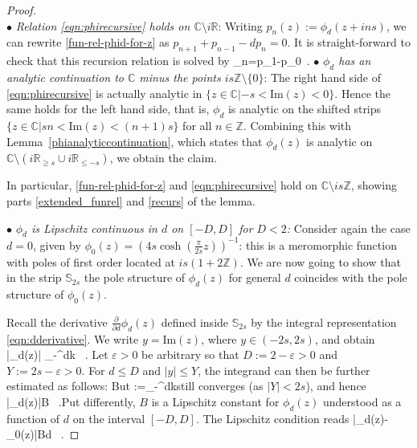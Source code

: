 \documentclass[12pt]{article}
\theoremstyle{plain}
\theoremstyle{definition}
\numberwithin{equation}{section}
\numberwithin{theorem}{section}
\def\be#1\ee{\begin{equation}#1\end{equation}}
\begin{document}
\begin{proof}~\\
$\bullet$ {\em Relation \eqref{eqn:phirecursive} holds on
$\mathbb{C}\setminus i\mathbb{R}$}: Writing $p_n(z):=\phi_d(z+ins)$, we can rewrite \eqref{fun-rel-phid-for-z} as $p_{n+1}+p_{n-1}-dp_n=0$. 
 It is straight-forward to check that this recursion relation is solved by \be
 p_n=p_1-p_0\ .
 \ee
$\bullet$ {\em $\phi_d$ has an analytic continuation to $\mathbb{C}$ minus the points $is\mathbb{Z}\setminus\lbrace 0\rbrace$}: 
The right hand side of \eqref{eqn:phirecursive} is actually analytic in $\{ z \in \mathbb{C} | -s < \mathrm{Im}(z) < 0 \}$. Hence the same holds for the left hand side, that is, $\phi_d$ is analytic on the shifted strips $\{ z \in \mathbb{C} | sn < \mathrm{Im}(z) < (n+1)s \}$ for all $n \in \mathbb{Z}$. Combining this with Lemma~\ref{phianalyticcontinuation}, which states that $\phi_d(z)$ is analytic on $\mathbb{C}\setminus (i\mathbb{R}_{\geq s}\cup i\mathbb{R}_{\leq -s})$, we obtain the claim.

In particular, \eqref{fun-rel-phid-for-z} and \eqref{eqn:phirecursive} hold on $\mathbb{C} \setminus is\mathbb{Z}$, showing parts \ref{extended_funrel} and \ref{recurs} of the lemma.

\medskip

\noindent
$\bullet$ {\em $\phi_d$ is Lipschitz continuous in $d$ on $[-D,D]$ for $D<2$:}
Consider again the case $d=0$, given by $\phi_0(z)=\left(4s\cosh\left(\frac{\pi}{2s}z\right)\right)^{-1}$: this is a meromorphic function with poles of first order located at $is(1+2\mathbb{Z})$. 
We are now going to show that in the strip $\mathbb{S}_{2s}$ the pole structure of $\phi_d(z)$ for general $d$ coincides with the pole structure of $\phi_0(z)$. 

Recall the derivative $\frac{\partial}{\partial d}\phi_d(z)$ defined inside $\mathbb{S}_{2s}$ by the integral representation \eqref{eqn:dderivative}. We 
write $y=\mathrm{Im}(z)$, where $y\in(-2s,2s)$, and obtain 
\be
\left|\phi_d(z)\right|\leq {} \int_{-\infty}^\infty{}dk \ .
\ee 
	Let $\varepsilon>0$ be arbitrary so that $D:=2-\varepsilon>0$ and $Y:=2s-\varepsilon>0$. For $d\leq D$ and $|y|\leq Y$, the integrand can then be further estimated as follows:
\be\frac{e^{-ky}}{\left(2\cosh(sk)-d\right)^2}\leq {}\leq {}\ee But \be 
B:=\int_{-\infty}^\infty {}dk\ee still converges (as $|Y|<2s$), and hence \be\left|\phi_d(z)\right|\leq B \ .\ee Put differently, $B$ is a Lipschitz constant for $\phi_d(z)$ understood as a function of $d$ on the interval $[-D,D]$. The Lipschitz condition reads \be\left|\phi_d(z)-\phi_0(z)\right|\leq B\cdot d \ .
\ee


\end{proof}
\end{document}
